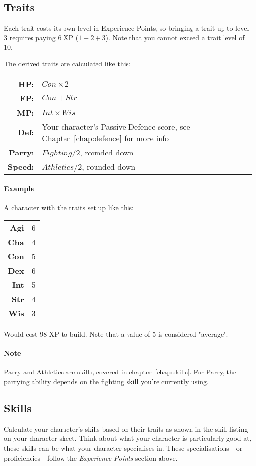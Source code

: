 \subsection{Traits}
Each trait costs its own level in Experience Points, so bringing a trait up to level 3 requires paying 6 XP ($1 + 2 + 3$).
Note that you cannot exceed a trait level of 10.

The derived traits are calculated like this:

\begin{tabular} {r | l} 
\textbf{HP:} & $Con \times 2$ \\
\textbf{FP:} & $Con + Str$ \\
\textbf{MP:} & $Int \times Wis$ \\
\textbf{Def:} & Your character's Passive Defence score, see Chapter~\ref{chap:defence} for more info \\
\textbf{Parry:} & $Fighting / 2$, rounded down \\
\textbf{Speed:} & $Athletics / 2$, rounded down \\
\end{tabular}

\paragraph{Example} A character with the traits set up like this:

\begin{tabular}{r | l}
    \textbf{Agi} & 6\\
    \textbf{Cha} & 4\\
    \textbf{Con} & 5\\
    \textbf{Dex} & 6\\
    \textbf{Int} & 5\\
    \textbf{Str} & 4\\
    \textbf{Wis} & 3\\
\end{tabular}

Would cost 98 XP to build.
Note that a value of 5 is considered "average".

\paragraph{Note} Parry and Athletics are skills, covered in chapter~\ref{chap:skills}.
For Parry, the parrying ability depends on the fighting skill you're currently using.

\subsection{Skills}
Calculate your character's skills based on their traits as shown in the skill listing on your character sheet.
Think about what your character is particularly good at, these skills can be what your character specialises in.
These specialisations---or proficiencies---follow the \textit{Experience Points} section above.

